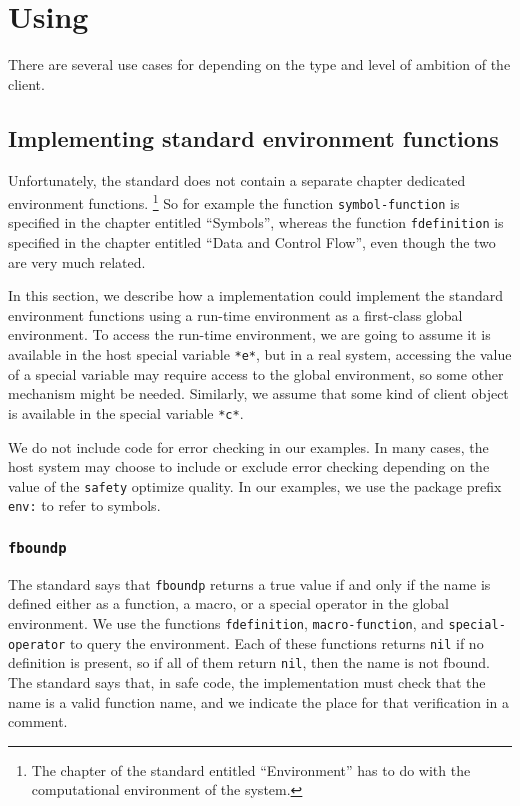 \chapter{Using \sysname{}}

There are several use cases for \sysname{} depending on the type and
level of ambition of the client.

\section{Implementing standard environment functions}

Unfortunately, the \commonlisp{} standard does not contain a separate
chapter dedicated environment functions.%
\footnote{The chapter of the standard
  entitled ``Environment'' has to do with the computational environment
  of the \commonlisp{} system.}
So for example the function \texttt{symbol-function} is specified in
the chapter entitled ``Symbols'', whereas the function
\texttt{fdefinition} is specified in the chapter entitled ``Data and
Control Flow'', even though the two are very much related.

In this section, we describe how a \commonlisp{} implementation could
implement the standard environment functions using a \sysname{}
run-time environment as a first-class global environment.  To access
the \sysname{} run-time environment, we are going to assume it is
available in the host special variable \texttt{*e*}, but in
a real system, accessing the value of a special variable may require
access to the global environment, so some other mechanism might be
needed.  Similarly, we assume that some kind of client object is
available in the special variable \texttt{*c*}.

We do not include code for error checking in our examples.  In many
cases, the host \commonlisp{} system may choose to include or exclude
error checking depending on the value of the \texttt{safety} optimize
quality.  In our examples, we use the package prefix \texttt{env:} to
refer to \sysname{} symbols.

\subsection{\texttt{fboundp}}

The standard says that \texttt{fboundp} returns a true value if and
only if the name is defined either as a function, a macro, or a
special operator in the global environment.  We use the \sysname{}
functions \texttt{fdefinition}, \texttt{macro-function}, and
\texttt{special-operator} to query the environment.  Each of these
functions returns \texttt{nil} if no definition is present, so if all
of them return \texttt{nil}, then the name is not fbound.  The
standard says that, in safe code, the implementation must check that
the name is a valid function name, and we indicate the place for that
verification in a comment.

